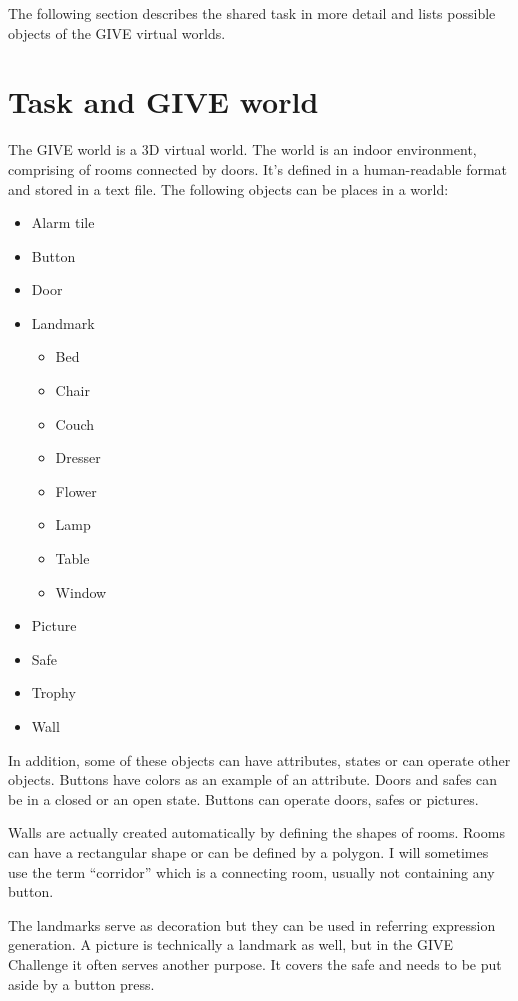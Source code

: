 The following section describes the shared task in more detail and lists possible objects of the GIVE virtual worlds.

\section{Task and GIVE world}
\label{sec:task-give-world}
The GIVE world is a 3D virtual world. The world is an indoor environment, comprising of rooms connected by doors. It's defined in a human-readable format and stored in a text file. The following objects can be places in a world:

\begin{itemize}
\item
Alarm tile
\item
Button
\item
Door
\item 
Landmark
	\begin{itemize}
	\item
	Bed	
	\item
	Chair	
	\item
	Couch	
	\item
	Dresser
	\item
	Flower	
	\item
	Lamp
	\item
	Table
	\item
	Window
	\end{itemize}
\item
Picture
\item
Safe
\item
Trophy
\item
Wall
\end{itemize}

In addition, some of these objects can have attributes, states or can operate other objects. Buttons have colors as an example of an attribute. Doors and safes can be in a closed or an open state. Buttons can operate doors, safes or pictures.

Walls are actually created automatically by defining the shapes of rooms. Rooms can have a rectangular shape or can be defined by a polygon. I will sometimes use the term ``corridor'' which is a connecting room, usually not containing any button.

The landmarks serve as decoration but they can be used in referring expression generation. A picture is technically a landmark as well, but in the GIVE Challenge it often serves another purpose. It covers the safe and needs to be put aside by a button press.

